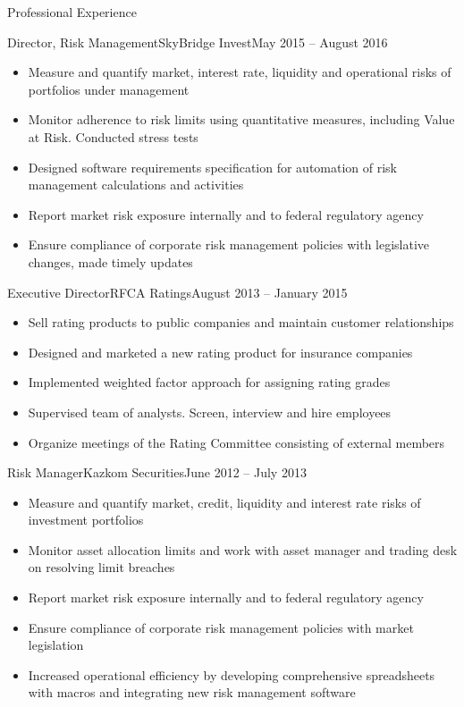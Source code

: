 \documentclass[]{mcdowellcv}
\begin{document}
\begin{cvsection}{Professional Experience}
  \begin{cvsubsection}{Director, Risk Management}{SkyBridge Invest}{May 2015 -- August 2016}		
    \begin{itemize}
      \item Measure and quantify market, interest rate, liquidity and operational risks of portfolios under management
      \item Monitor adherence to risk limits using quantitative measures, including Value at Risk. Conducted stress tests
      \item Designed software requirements specification for automation of risk management calculations and activities
      \item Report market risk exposure internally and to federal regulatory agency
      \item Ensure compliance of corporate risk management policies with legislative changes, made timely updates
    \end{itemize}
  \end{cvsubsection}

  \begin{cvsubsection}{Executive Director}{RFCA Ratings}{August 2013 -- January 2015}
    \begin{itemize}
      \item Sell rating products to public companies and maintain customer relationships
      \item Designed and marketed a new rating product for insurance companies
      \item Implemented weighted factor approach for assigning rating grades
      \item Supervised team of analysts. Screen, interview and hire employees
      \item Organize meetings of the Rating Committee consisting of external members
    \end{itemize}
  \end{cvsubsection}

  \begin{cvsubsection}{Risk Manager}{Kazkom Securities}{June 2012 -- July 2013}
    \begin{itemize}
      \item Measure and quantify market, credit, liquidity and interest rate risks of investment portfolios
      \item Monitor asset allocation limits and work with asset manager and trading desk on resolving limit breaches
      \item Report market risk exposure internally and to federal regulatory agency
      \item Ensure compliance of corporate risk management policies with market legislation
      \item Increased operational efficiency by developing comprehensive spreadsheets with macros and integrating new risk management software
    \end{itemize}
  \end{cvsubsection}
\end{cvsection}
\end{document}
